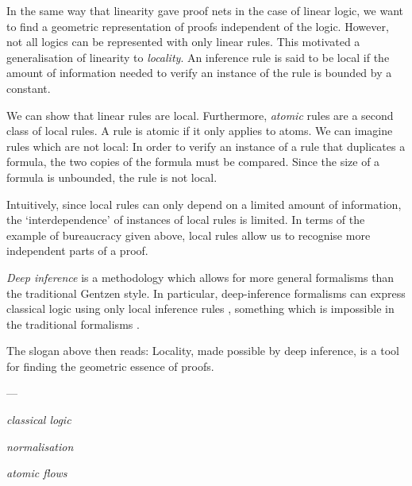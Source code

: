 In the same way that linearity gave proof nets in the case of linear logic, we want to find a geometric representation of proofs independent of the logic. However, not all logics can be represented with only linear rules. This motivated a generalisation of linearity to \emph{locality}. An inference rule is said to be local if the amount of information needed to verify an instance of the rule is bounded by a constant.

We can show that linear rules are local. Furthermore, \emph{atomic} rules are a second class of local rules. A rule is atomic if it only applies to atoms. We can imagine rules which are not local: In order to verify an instance of a rule that duplicates a formula, the two copies of the formula must be compared. Since the size of a formula is unbounded, the rule is not local.

Intuitively, since local rules can only depend on a limited amount of information, the `interdependence' of instances of local rules is limited. In terms of the example of bureaucracy given above, local rules allow us to recognise more independent parts of a proof.

\emph{Deep inference} \cite{Gugl:06:A-System:kl} is a methodology which allows for more general formalisms than the traditional Gentzen style. In particular, deep-inference formalisms can express classical logic using only local inference rules \cite{BrunTiu:01:A-Local-:mz}, something which is impossible in the traditional formalisms \cite{Brun:03:Two-Rest:mn}.

The slogan above then reads: Locality, made possible by deep inference, is a tool for finding the geometric essence of proofs.








---

\emph{classical logic}

\emph{normalisation}

\emph{atomic flows} \cite{GuglGund:07:Normalis:lr}

